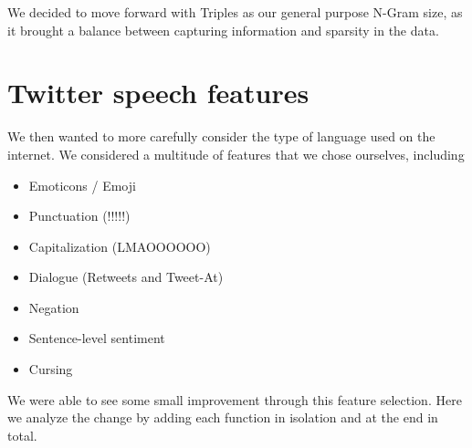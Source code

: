 \documentclass[11pt]{article}
\begin{document}
\def\ngramlablels{{"Bag-Of-Words", "Data-Cleansing", "Bi-grams", "Tri-grams", "Quad-grams", "Penta-grams"}}
\begin{center}
\end{center}

We decided to move forward with Triples as our general purpose N-Gram size, as it brought a balance between capturing information and sparsity in the data.

\section{Twitter speech features}

We then wanted to more carefully consider the type of language used on the internet. We considered a multitude of features that we chose ourselves, including

\begin{itemize}
\item Emoticons / Emoji
\item Punctuation (!!!!!)
\item Capitalization (LMAOOOOOO)
\item Dialogue (Retweets and Tweet-At)
\item Negation
\item Sentence-level sentiment
\item Cursing
\end{itemize}

We were able to see some small improvement through this feature selection. Here we analyze the change by adding each function in isolation and at the end in total.
\end{document}
